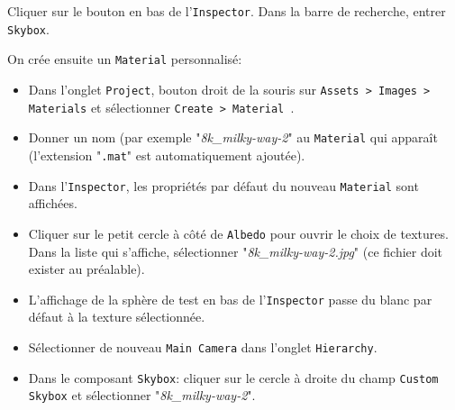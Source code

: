 \documentclass[a4paper,10pt]{article}
\newenvironment{solution}%
{\begin{tcolorbox}[breakable,colback=red!5!white,colframe=red!75!black,title=Solution]}%
{\end{tcolorbox}}
\begin{document}
\begin{solution}
Cliquer sur le bouton  en bas de l'\texttt{Inspector}. Dans la barre de recherche, entrer \texttt{Skybox}.

On crée ensuite un \texttt{Material} personnalisé:
\begin{itemize}
	\item Dans l'onglet \texttt{Project}, bouton droit de la souris sur \texttt{Assets > Images > Materials} et sélectionner \texttt{Create > Material }.
	\item Donner un nom (par exemple "\textit{8k\_milky-way-2}" au \texttt{Material} qui apparaît (l'extension "\texttt{.mat}" est automatiquement ajoutée).
	\item Dans l'\texttt{Inspector}, les propriétés par défaut du nouveau \texttt{Material} sont affichées.
	\item Cliquer sur le petit cercle à côté de \texttt{Albedo} pour ouvrir le choix de textures. Dans la liste qui s'affiche, sélectionner "\textit{8k\_milky-way-2.jpg}" (ce fichier doit exister au préalable).
	\item L'affichage de la sphère de test en bas de l'\texttt{Inspector} passe du blanc par défaut à la texture sélectionnée.
	\item Sélectionner de nouveau \texttt{Main Camera} dans l'onglet \texttt{Hierarchy}.
	\item Dans le composant \texttt{Skybox}: cliquer sur le cercle à droite du champ \texttt{Custom Skybox} et sélectionner "\textit{8k\_milky-way-2}".  
	
\end{itemize}
\end{solution}
\fi 
\end{document}
